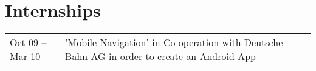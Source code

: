 \section*{Internships}
\begin{tabular}{p{3cm}p{10cm}}	
Oct 09 – Mar 10		& 	'Mobile Navigation' in Co-operation with Deutsche Bahn AG in order to create an Android App\\
\end{tabular}


\cleardoublepage